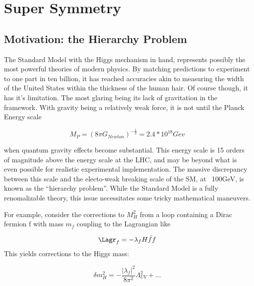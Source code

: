 


\chapter{Super Symmetry}
\section{Motivation: the Hierarchy Problem}

The Standard Model with the Higgs mechanism in hand, represents possibly the most powerful theories of modern physics. By matching predictions to experiment to one part in ten billion, it has reached accuracies akin to measuring the width of the United States within the thickness of the human hair. Of course though, it has it’s limitation. The most glaring being its lack of gravitation in the framework. With gravity being a relatively weak force, it is not until the Planck Energy scale

\begin{equation*}
    M_P = (8 \pi G_{Newton})^{-\frac{1}{2}} = 2.4 * 10^18 Gev
\end{equation*}

when quantum gravity effects become substantial. This energy scale is 15 orders of magnitude above the energy scale at the LHC, and may be beyond what is even possible for realistic experimental implementation.  The massive discrepancy between this scale and the electo-weak breaking scale of the SM, at ~100GeV, is known as the “hierarchy problem”. While the Standard Model is a fully renomalizable theory, this issue necessitates some tricky mathematical maneuvers. 

 For example, consider the corrections to $M_H^2$ from a loop containing a Dirac fermion f with mass $m_f$ coupling to the Lagrangian like

\begin{equation*}
  \Lagr_f = -\lambda_f H \bar{f} f
\end{equation*}
This yields corrections to the Higgs mass:

\begin{equation*}
    \delta m_H^2 = - \frac{| \lambda_f |^2}{8 \pi^2} \Lambda_{UV}^2 + ...
\end{equation*}

